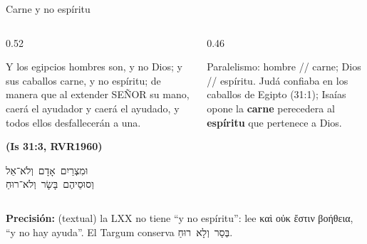\documentclass[hyperref={bookmarks=false},aspectratio=169]{beamer}
\newcommand{\heb}[1]{\mbox{\foreignlanguage{hebrew}{#1}}}
\newcommand{\grc}[1]{\foreignlanguage{ancientgreek}{#1}}
\newcommand{\SENOR}{S{\fontsize{0.78em}{1em}\selectfont EÑOR}}
\newcommand{\fuente}[1]{\par\hfill{\upshape\bfseries\footnotesize\textcolor{azul}{#1}}}
\newcommand{\destacar}[1]{\textbf{\textcolor{azul}{#1}}}
\newcommand{\precision}[1]{{\footnotesize\color{gris}\textbf{Precisión:} #1}}
\begin{document}
\begin{frame}{Carne y no espíritu}
\begin{columns}[c,onlytextwidth]
\begin{column}{0.52\textwidth}
\begin{cita}Y los egipcios hombres son, y no Dios; y sus caballos carne, y no espíritu; de manera que al extender \SENOR{} su mano, caerá el ayudador y caerá el ayudado, y todos ellos desfallecerán a una.\fuente{(Is 31:3, RVR1960)}\end{cita}
\begin{center}\heb{וּמִצְרַיִם אָדָם וְלֹא־אֵל}\\[2pt]\heb{וְסוּסֵיהֶם בָּשָׂר וְלֹא־רוּחַ}\end{center}
\end{column}
\begin{column}{0.46\textwidth}
\centering
{}\par\smallskip
\RaggedRight\small Paralelismo: hombre // carne; Dios // espíritu. Judá confiaba en los caballos de Egipto (31:1); Isaías opone la \destacar{carne} perecedera al \destacar{espíritu} que pertenece a Dios.
\end{column}
\end{columns}\par\smallskip
\precision{(textual) la LXX no tiene ``y no espíritu'': lee \grc{καὶ οὐκ ἔστιν βοήθεια}, ``y no hay ayuda''. El Targum conserva \heb{בְּסַר וְלָא רוּחַ}.}
\end{frame}
\end{document}
